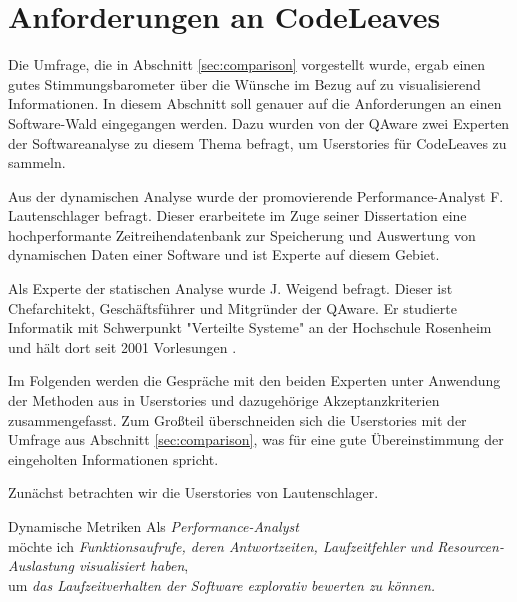 \section{Anforderungen an CodeLeaves}
\label{sec:requirements}

Die Umfrage, die in Abschnitt \ref{sec:comparison} vorgestellt wurde, ergab einen gutes Stimmungsbarometer über die Wünsche im Bezug auf zu visualisierend Informationen. In diesem Abschnitt soll genauer auf die Anforderungen an einen Software-Wald eingegangen werden. Dazu wurden von der QAware zwei Experten der Softwareanalyse zu diesem Thema befragt, um Userstories für CodeLeaves zu sammeln.

Aus der dynamischen Analyse wurde der promovierende Performance-Analyst F. Lautenschlager befragt. Dieser erarbeitete im Zuge seiner Dissertation eine hochperformante Zeitreihendatenbank zur Speicherung und Auswertung von dynamischen Daten einer Software und ist Experte auf diesem Gebiet.

Als Experte der statischen Analyse wurde J. Weigend befragt. Dieser ist Chefarchitekt, Geschäftsführer und Mitgründer der QAware. Er studierte Informatik mit Schwerpunkt "Verteilte Systeme" an der Hochschule Rosenheim und hält dort seit 2001 Vorlesungen \cite{qaware2017johannes}.

Im Folgenden werden die Gespräche mit den beiden Experten unter Anwendung der Methoden aus \cite{cohn2004user} in Userstories und dazugehörige Akzeptanzkriterien zusammengefasst. Zum Großteil überschneiden sich die Userstories mit der Umfrage aus Abschnitt \ref{sec:comparison}, was für eine gute Übereinstimmung der eingeholten Informationen spricht.

Zunächst betrachten wir die Userstories von Lautenschlager.
\begin{userstoryf}{Dynamische Metriken}
  Als \textit{Performance-Analyst}\\
  möchte ich \textit{Funktionsaufrufe, deren Antwortzeiten, Laufzeitfehler und Resourcen-Auslastung visualisiert haben},\\
  um \textit{das Laufzeitverhalten der Software explorativ bewerten zu können.}
\end{userstoryf}
  
